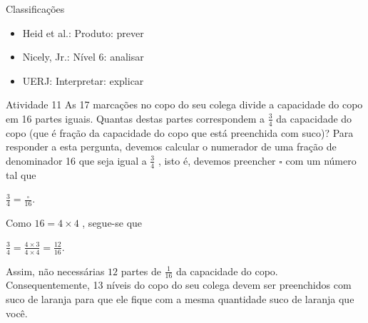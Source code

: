 \documentclass[oneside]{book}
\begin{document}
\begin{multicols}{2}
Classificações
\begin{itemize} %
  \item     Heid et al.: Produto: prever
  \item     Nicely, Jr.: Nível 6: analisar
  \item     UERJ: Interpretar: explicar
\end{itemize} %

\begin{resposta*}{Atividade 11}  
  As 17 marcações no copo do seu colega divide a capacidade do copo em 16 partes 
iguais. Quantas destas partes correspondem a   $\frac{3}{4}$   da capacidade do 
copo (que é fração da capacidade do copo que está preenchida com suco)? Para 
responder a esta pergunta, devemos calcular o numerador de uma fração de 
denominador 16 que seja igual a   $\frac{3}{4}$  , isto é, devemos preencher   
$\square$   com um número tal que  
  
  $\frac{3}{4} = \frac{\square}{16}$.  
  
  Como   $16 = 4 \times 4$  , segue-se que  
  
  $\frac{3}{4} = \frac{4 \times 3}{4 \times 4} = \frac{12}{16}$.   
  
  Assim, não necessárias   $12$   partes de   $\frac{1}{16}$   da capacidade do 
copo. Consequentemente,  
  13 níveis do copo do seu colega devem ser preenchidos com suco de laranja para 
que ele fique com a mesma quantidade suco de laranja que você.  
  

\begin{center}
\end{center}


\end{resposta*}
\end{multicols}
\end{document}

